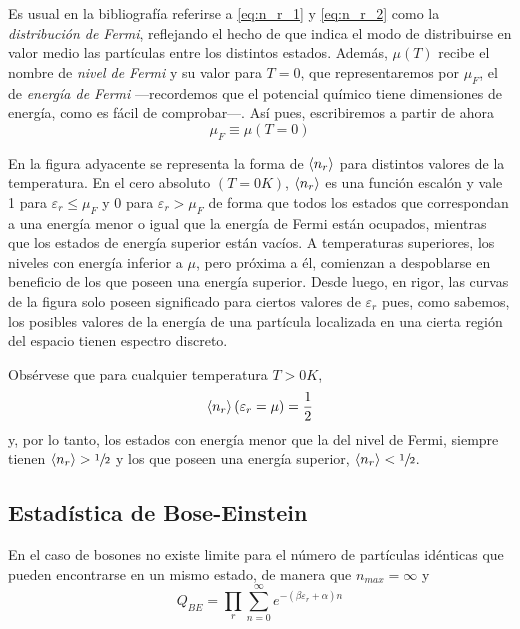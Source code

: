 Es usual en la bibliografía referirse a \eqref{eq:n_r_1} y \eqref{eq:n_r_2} como la \emph{distribución de Fermi}, reflejando el hecho de que indica el modo de distribuirse en valor medio las partículas entre los distintos estados.
Además, $\mu (T)$ recibe el nombre de \emph{nivel de Fermi} y su valor para $T = 0$, que representaremos por $\mu_F$, el de \emph{energía de Fermi} ---recordemos que el potencial químico tiene dimensiones de energía, como es fácil de comprobar---.
Así pues, escribiremos a partir de ahora
$$\mu_F \equiv \mu(T=0)$$

\begin{wrapfigure}{r}{0.4\textwidth}
	\centering
	\hspace{3.5cm}
	
	\vspace{-0.5cm}
\end{wrapfigure}
En la figura adyacente se representa la forma de $\expval{n_r}$ para distintos valores de la temperatura.
En el cero absoluto $(T = 0K)$, $\expval{n_r}$ es una función escalón y vale 1 para $\varepsilon_r \leq \mu_F$ y 0 para $\varepsilon_r > \mu_F$ de forma que todos los estados que correspondan a una energía menor o igual que la energía de Fermi están ocupados, mientras que los estados de energía superior están vacíos.
A temperaturas superiores, los niveles con energía inferior a $\mu$, pero próxima a él, comienzan a despoblarse en beneficio de los que poseen una energía superior.
Desde luego, en rigor, las curvas de la figura solo poseen significado para ciertos valores de $\varepsilon_r$ pues, como sabemos, los posibles valores de la energía de una partícula localizada en una cierta región del espacio tienen espectro discreto.

Obsérvese que para cualquier temperatura $T > 0 K$,
\begin{equation}
	\expval{n_r} (\varepsilon_r = \mu )= \frac{1}{2}
\end{equation}
y, por lo tanto, los estados con energía menor que la del nivel de Fermi, siempre tienen $\expval{n_r} > \sfrac{1}{2}$ y los que poseen una energía superior, $\expval{n_r} < \sfrac{1}{2}$.

\subsection*{Estadística de Bose-Einstein}

En el caso de bosones no existe limite para el número de partículas idénticas que pueden encontrarse en un mismo estado, de manera que $n_{max} = \infty$ y
\begin{equation}
	Q_{BE} = \prod_r \sum_{n=0}^{\infty} e^{-(\beta\varepsilon_r + \alpha) n}
\end{equation}

